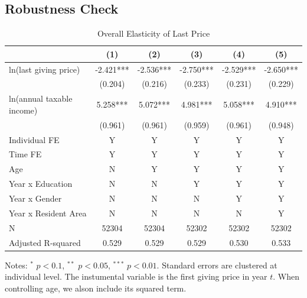 \documentclass[
  11pt,
  a4paper,
]{article}
\begin{document}
\hypertarget{robustness-check}{%
\subsection{Robustness Check}\label{robustness-check}}

\begin{table}

\caption{\label{tab:LastOverall}Overall Elasticity of Last Price}
\centering
\fontsize{9}{11}\selectfont
\begin{threeparttable}
\begin{tabular}[t]{lccccc}
\toprule
 & (1) & (2) & (3) & (4) & (5)\\
\midrule
ln(last giving price) & -2.421*** & -2.536*** & -2.750*** & -2.529*** & -2.650***\\
 & (0.204) & (0.216) & (0.233) & (0.231) & (0.229)\\
ln(annual taxable income) & 5.258*** & 5.072*** & 4.981*** & 5.058*** & 4.910***\\
 & (0.961) & (0.961) & (0.959) & (0.961) & (0.948)\\
Individual FE & Y & Y & Y & Y & Y\\
Time FE & Y & Y & Y & Y & Y\\
Age & N & Y & Y & Y & Y\\
Year x Education & N & N & Y & Y & Y\\
Year x Gender & N & N & N & Y & Y\\
Year x Resident Area & N & N & N & N & Y\\
N & 52304 & 52304 & 52302 & 52302 & 52302\\
Adjusted R-squared & 0.529 & 0.529 & 0.529 & 0.530 & 0.533\\
\bottomrule
\end{tabular}
\begin{tablenotes}
\item Notes: $^{*}$ $p < 0.1$, $^{**}$ $p < 0.05$, $^{***}$ $p < 0.01$. Standard errors are clustered at individual level. The instumental variable is the first giving price in year $t$. When controlling age, we alson include its squared term.
\end{tablenotes}
\end{threeparttable}
\end{table}
\end{document}
